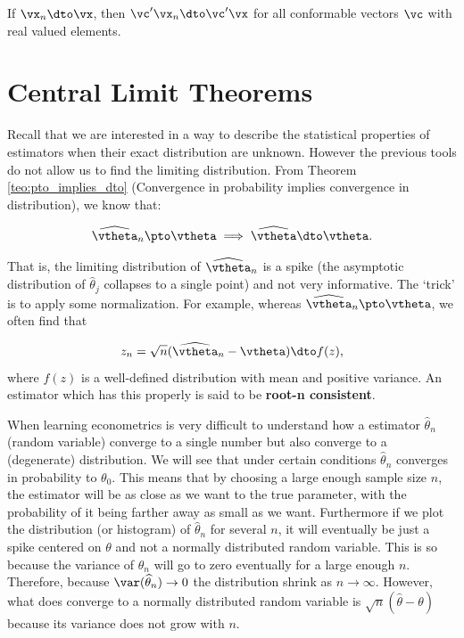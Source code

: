 \begin{theorem}
If $\vx_n \dto \vx$, then $\vc'\vx_n \dto \vc'\vx$ for all conformable vectors $\vc$ with real valued elements.
\end{theorem}

\section{Central Limit Theorems}

Recall that we are interested in a way to describe the statistical properties of estimators when their exact distribution are unknown. However the previous tools do not allow us to find the limiting distribution. From Theorem \ref{teo:pto_implies_dto} (Convergence in probability implies convergence in distribution), we know that:

\begin{equation*}
  \widehat{\vtheta}_n\pto \vtheta \implies \widehat{\vtheta}\dto \vtheta.
\end{equation*}

That is, the limiting distribution of $\widehat{\vtheta}_n$ is a spike (the asymptotic distribution of $\widehat{\theta}_j$ collapses to a single point) and not very informative. The `trick' is to apply some normalization. For example, whereas $\widehat{\vtheta}_n\pto \vtheta$, we often find that

\begin{equation}
z_n = \sqrt{n}(\widehat{\vtheta}_n - \vtheta) \dto f(z),
\end{equation}
%
where $f(z)$ is a well-defined distribution with mean and positive variance. An estimator which has this properly is said to be \textbf{root-n consistent}.

\begin{mynote}
When learning econometrics is very difficult to understand how a estimator $\widehat{\theta}_n$ (random variable) converge to a single number but also converge to a (degenerate) distribution. We will see that under certain conditions $\widehat{\theta}_n$ converges in probability to $\theta_0$. This means that by choosing a large enough sample size $n$, the estimator will be as close as we want to the true parameter, with the probability of it being farther away as small as we want. Furthermore if we plot the distribution (or histogram) of $\widehat{\theta}_n$ for several $n$, it will eventually be just a spike centered on $\theta$ and not a normally distributed random variable. This is so because the variance of $\widehat{\theta}_n$ will go to zero eventually for a large enough $n$. Therefore, because $\var(\widehat{\theta}_n)\to 0$ the distribution shrink as $n\to \infty$. However, what does converge to a normally distributed random variable is $\sqrt{n}(\widehat{\theta}- \theta)$ because its variance does not grow with $n$. 
\end{mynote}

